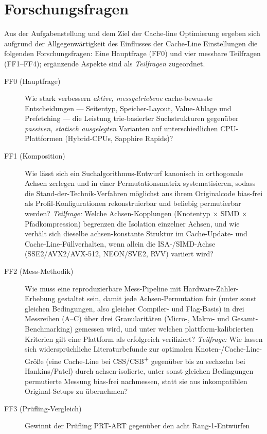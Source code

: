 \section{Forschungsfragen}\label{sec:rqs}
Aus der Aufgabenstellung und dem Ziel der Cache-line Optimierung ergeben sich aufgrund der
Allgegenwärtigkeit des Einflusses der Cache-Line Einstellungen die folgenden Forschungsfragen: Eine
Hauptfrage (FF0) und vier messbare Teilfragen (FF1--FF4); ergänzende Aspekte sind als
\emph{Teilfragen} zugeordnet.
\begin{description}
  \item[FF0 (Hauptfrage)] Wie stark verbessern \emph{aktive, messgetriebene} cache-bewusste
  Entscheidungen --- Seitentyp, Speicher-Layout, Value-Ablage und Prefetching --- die Leistung
  trie-basierter Suchstrukturen gegenüber \emph{passiven, statisch ausgelegten} Varianten auf
  unterschiedlichen CPU-Plattformen (Hybrid-CPUs, Sapphire Rapids)?
  \item[FF1 (Komposition)] Wie lässt sich ein Suchalgorithmus-Entwurf kanonisch in orthogonale
  Achsen zerlegen und in einer Permutationsmatrix systematisieren, sodass die
  Stand-der-Technik-Verfahren möglichst aus ihrem Originalcode bias-frei als Profil-Konfigurationen
  rekonstruierbar und beliebig permutierbar werden? \emph{Teilfrage:} Welche Achsen-Kopplungen
  (Knotentyp $\times$ SIMD $\times$ Pfadkompression) begrenzen die Isolation einzelner Achsen, und
  wie verhält sich dieselbe achsen-konstante Struktur im Cache-Update- und Cache-Line-Füllverhalten,
  wenn allein die ISA-/SIMD-Achse (SSE2/AVX2/AVX-512, NEON/SVE2, RVV) variiert wird?
  \item[FF2 (Mess-Methodik)] Wie muss eine reproduzierbare Mess-Pipeline mit
  Hardware-Zähler-Erhebung gestaltet sein, damit jede Achsen-Permutation fair (unter sonst gleichen
  Bedingungen, also gleicher Compiler- und Flag-Basis) in drei Messreihen (A--C) über drei
  Granularitäten (Micro-, Makro- und Gesamt-Benchmarking) gemessen wird, und unter welchen
  plattform-kalibrierten Kriterien gilt eine Plattform als erfolgreich verifiziert?
  \emph{Teilfrage:} Wie lassen sich widersprüchliche Literaturbefunde zur optimalen
  Knoten-/Cache-Line-Größe (eine Cache-Line bei CSS/CSB\textsuperscript{+} gegenüber bis zu sechzehn
  bei Hankins/Patel) durch achsen-isolierte, unter sonst gleichen Bedingungen permutierte Messung
  bias-frei nachmessen, statt sie aus inkompatiblen Original-Setups zu übernehmen?
  \item[FF3 (Prüfling-Vergleich)] Gewinnt der Prüfling PRT-ART gegenüber den acht Rang-1-Entwürfen

\end{description}
